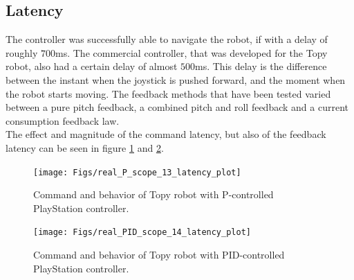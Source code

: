 \subsection{Latency}
The controller was successfully able to navigate the robot, if with a delay of roughly $700$ms. The commercial controller, that was developed for the Topy robot, also had a certain delay of almost $500$ms. This delay is the difference between the instant when the joystick is pushed forward, and the moment when the robot starts moving. The feedback methods that have been tested varied between a pure pitch feedback, a combined pitch and roll feedback and a current consumption feedback law. \\%
The effect and magnitude of the command latency, but also of the feedback latency can be seen in figure \ref{fig:real_P_scope_13_latency_plot} and \ref{fig:real_PID_scope_14_latency_plot}.

\begin{figure}[h!]
	\centering
	\texttt{[image: Figs/real\_P\_scope\_13\_latency\_plot]}
	\caption{Command and behavior of Topy robot with P-controlled PlayStation controller.}
	\label{fig:real_P_scope_13_latency_plot}
\end{figure}


\begin{figure}[h!]
	\centering
	\texttt{[image: Figs/real\_PID\_scope\_14\_latency\_plot]}
	\caption{Command and behavior of Topy robot with PID-controlled PlayStation controller.}
	\label{fig:real_PID_scope_14_latency_plot}
\end{figure}

